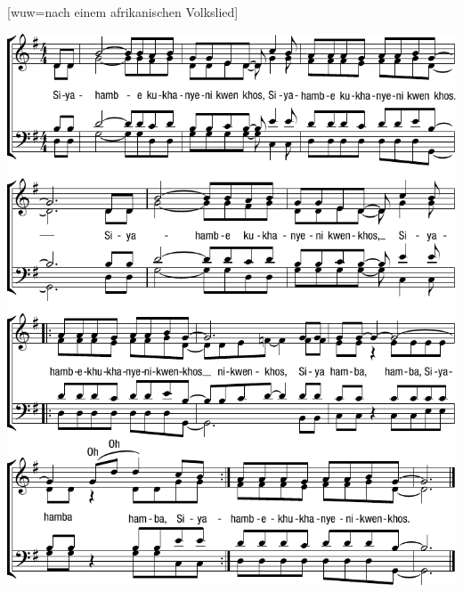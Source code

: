 [wuw={nach einem afrikanischen Volkslied}]

\markboth{\songtitle}{\songtitle}

\centering\includegraphics[width=1\textwidth]{Noten/Lied118.pdf}

\endsong